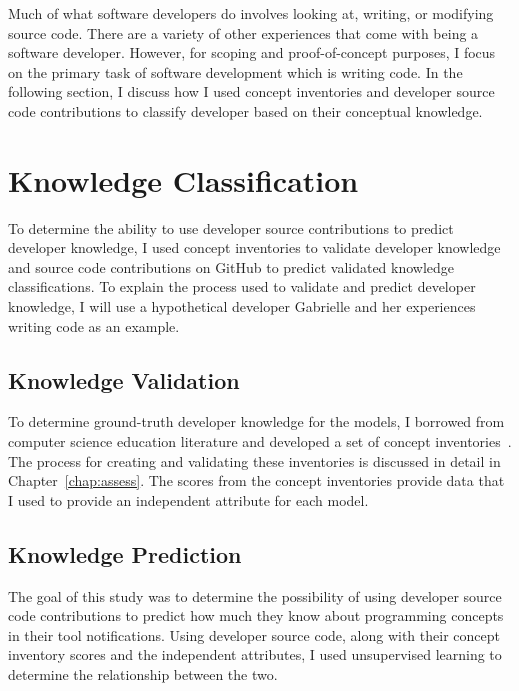 Much of what software developers do involves looking at, writing, or modifying source code. 
There are a variety of other experiences that come with being a software developer. However, for scoping and proof-of-concept purposes, I focus on the primary task of software development which is writing code.
In the following section, I discuss how I used concept inventories and developer source code contributions to classify developer based on their conceptual knowledge.

\section{Knowledge Classification}

To determine the ability to use developer source contributions to predict developer knowledge, I used concept inventories to validate developer knowledge and source code contributions on GitHub to predict validated knowledge classifications.
To explain the process used to validate and predict developer knowledge, I will use a hypothetical developer Gabrielle and her experiences writing code as an example.

\subsection{Knowledge Validation}

To determine ground-truth developer knowledge for the models, I borrowed from computer science education literature and developed a set of concept inventories~\cite{tew2010assessing}.
The process for creating and validating these inventories is discussed in detail in Chapter~\ref{chap:assess}.
The scores from the concept inventories provide data that I used to provide an independent attribute for each model. 

\subsection{Knowledge Prediction}
The goal of this study was to determine the possibility of using developer source code contributions to predict how much they know about programming concepts in their tool notifications.
Using developer source code, along with their concept inventory scores and the independent attributes, I used unsupervised learning to determine the relationship between the two.

